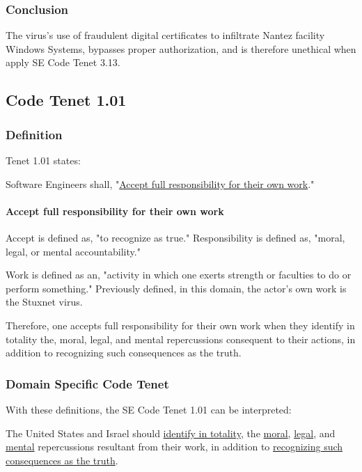 \documentclass[12pt]{article}
\begin{document}
\begin{multicols}{2}
\subsubsection{Conclusion}

The virus’s use of fraudulent digital certiﬁcates to inﬁltrate Nantez facility Windows Systems, bypasses proper authorization, and is therefore unethical when apply SE Code Tenet 3.13.

\subsection{Code Tenet 1.01}

\subsubsection{Definition}

Tenet 1.01 states:
\begin{framed}
Software Engineers shall, "\ul{Accept full responsibility for their own work}."\cite{softwareEngineeringCodeOfEthics}
\end{framed}

\paragraph{Accept full responsibility for their own work}

Accept is defined as, "to recognize as true."\cite{merriamWebsterDefinitions} Responsibility is defined as, "moral, legal, or mental accountability."\cite{merriamWebsterDefinitions}

Work is defined as an, "activity in which one exerts strength or faculties to do or perform something."\cite{cambridgeDictionary} Previously defined, in this domain, the actor's own work is the Stuxnet virus.

Therefore, one accepts full responsibility for their own work when they identify in totality  the, moral, legal, and mental repercussions consequent to their actions, in addition to recognizing such consequences as the truth.\cite{cambridgeDictionary}

\subsubsection{Domain Specific Code Tenet}

With these definitions, the SE Code Tenet 1.01 can be interpreted:
\begin{framed}
The United States and Israel should \ul{identify in totality}, the \ul{moral}, \ul{legal}, and \ul{mental} repercussions resultant from their work, in addition to \ul{recognizing such consequences as the truth}.
\end{framed}


\end{multicols}
\end{document}
